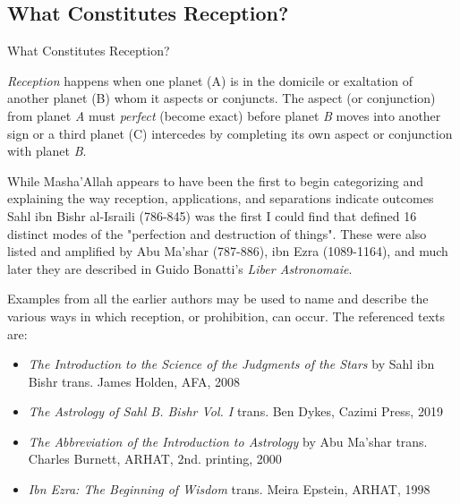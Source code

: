 \subsection{What Constitutes Reception?}
\begin{frame}[t]{What Constitutes Reception?}
\small
\begin{block}{}
\textsl{Reception} happens when one planet (A) is in the domicile or exaltation of another planet (B) whom it aspects or conjuncts. The aspect (or conjunction) from planet \textsl{A} must \textsl{perfect} (become exact)  before planet \textsl{B} moves into another sign or a third planet (C) intercedes by completing its own aspect or conjunction with planet \textsl{B}.
\end{block}

While Masha'Allah appears to have been the first to begin categorizing and explaining the way reception, applications, and separations indicate outcomes Sahl ibn Bishr al-Israili (786-845) was the first I could find that defined 16 distinct modes of the "perfection and destruction of things". These were also listed and amplified by  Abu Ma'shar (787-886),  ibn Ezra (1089-1164), and much later they are described in Guido Bonatti's \textsl{Liber Astronomaie}.

Examples from all the earlier authors may be used to name and describe the various ways in which reception, or prohibition, can occur. The referenced texts are:
\begin{itemize}
\small
\item \textsl{The Introduction to the Science of the Judgments of the Stars} by Sahl ibn Bishr trans. James Holden, AFA, 2008 
\item \textsl{The Astrology of Sahl B. Bishr Vol. I} trans. Ben Dykes, Cazimi Press, 2019

\item \textsl{The Abbreviation of the Introduction to Astrology} by Abu Ma'shar trans. Charles Burnett, ARHAT, 2nd. printing, 2000

\item \textsl{Ibn Ezra: The Beginning of Wisdom} trans. Meira Epstein, ARHAT, 1998
\end{itemize}

\end{frame}
